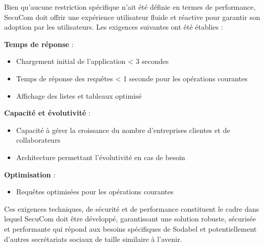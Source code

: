 Bien qu'aucune restriction spécifique n'ait été définie en termes de performance, SecuCom doit offrir une expérience utilisateur fluide et réactive pour garantir son adoption par les utilisateurs. Les exigences suivantes ont été établies :


\vspace{0.5cm}
\textbf{Temps de réponse} :
\begin{itemize}[leftmargin=*,label=\textcolor{darkgray}{$\bullet$},itemsep=0.3em]
  \item Chargement initial de l'application < 3 secondes
  \item Temps de réponse des requêtes < 1 seconde pour les opérations courantes
  \item Affichage des listes et tableaux optimisé
\end{itemize}


\vspace{0.5cm}
\textbf{Capacité et évolutivité} :
\begin{itemize}[leftmargin=*,label=\textcolor{darkgray}{$\bullet$},itemsep=0.3em]
  \item Capacité à gérer la croissance du nombre d'entreprises clientes et de collaborateurs
  \item Architecture permettant l'évolutivité en cas de besoin
\end{itemize}


\vspace{0.5cm}
\textbf{Optimisation} :
\begin{itemize}[leftmargin=*,label=\textcolor{darkgray}{$\bullet$},itemsep=0.3em]
  \item Requêtes optimisées pour les opérations courantes
\end{itemize}

\vspace{1cm}

\begin{tcolorbox}[
  title={\textbf{Cadre des exigences}},
  colback=blue!5!white,
  colframe=primarycolor,
  fonttitle=\bfseries,
  boxrule=0.5mm,
  arc=2mm,
  left=6mm,
  right=6mm,
  top=6mm,
  bottom=6mm
]
Ces exigences techniques, de sécurité et de performance constituent le cadre dans lequel SecuCom doit être développé, garantissant une solution robuste, sécurisée et performante qui répond aux besoins spécifiques de Sodabel et potentiellement d'autres secrétariats sociaux de taille similaire à l'avenir.
\end{tcolorbox}
